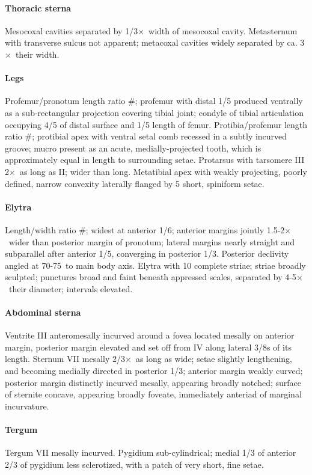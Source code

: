 \documentclass[fleqn,10pt,lineno]{wlpeerj} %
\newcommand{\td}{\textdegree~}
\newcommand{\x}{$\times$~}
\begin{document}
			\paragraph{Thoracic sterna} 
				Mesocoxal cavities separated by 1/3\x width of mesocoxal cavity. 
				Metasternum with transverse sulcus not apparent; metacoxal cavities widely separated by ca. 3\x their width.
			\paragraph{Legs}
				Profemur/pronotum length ratio \#; profemur with distal 1/5 produced ventrally as a sub-rectangular projection covering tibial joint; condyle of tibial articulation occupying 4/5 of distal surface and 1/5 length of femur. 
				Protibia/profemur length ratio \#; protibial apex with ventral setal comb recessed in a subtly incurved groove; mucro present as an acute, medially-projected tooth, which is approximately equal in length to surrounding setae. 
				Protarsus with tarsomere III 2\x as long as II; wider than long. 
				Metatibial apex with weakly projecting, poorly defined, narrow convexity laterally flanged by 5 short, spiniform setae.
			\paragraph{Elytra}
				Length/width ratio \#; widest at anterior 1/6; anterior margins jointly 1.5-2\x wider than posterior margin of pronotum; lateral margins nearly straight and subparallel after anterior 1/5, converging in posterior 1/3. 
				Posterior declivity angled at 70-75\td to main body axis. Elytra with 10 complete striae; striae broadly sculpted; punctures broad and faint beneath appressed scales, separated by 4-5\x their diameter; intervals elevated.
			\paragraph{Abdominal sterna}
				Ventrite III anteromesally incurved around a fovea located mesally on anterior margin, posterior margin elevated and set off from IV along lateral 3/8s of its length. 
				Sternum VII mesally 2/3\x as long as wide; setae slightly lengthening, and becoming medially directed in posterior 1/3; anterior margin weakly curved; posterior margin distinctly incurved mesally, appearing broadly notched; surface of sternite concave, appearing broadly foveate, immediately anteriad of marginal incurvature.
			\paragraph{Tergum}
				Tergum VII mesally incurved.
				Pygidium sub-cylindrical; medial 1/3 of anterior 2/3 of pygidium less sclerotized, with a patch of very short, fine setae.
\end{document}
